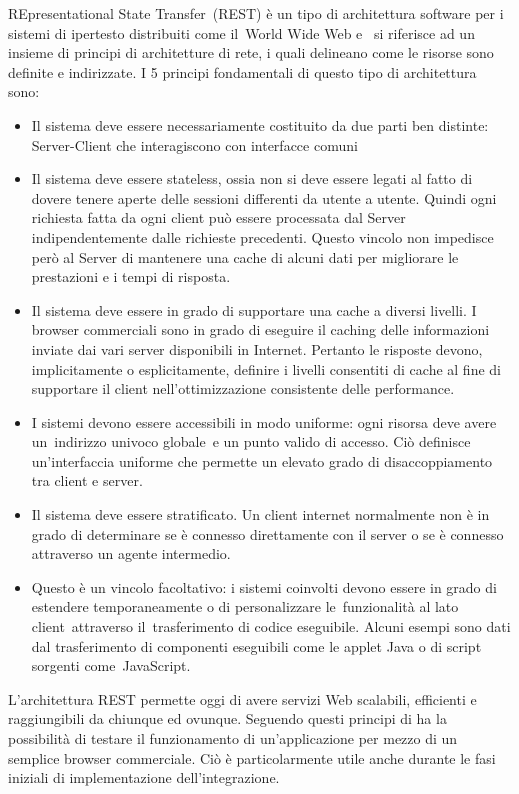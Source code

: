 REpresentational State Transfer (REST) è un tipo di architettura software per i sistemi di ipertesto distribuiti come il World Wide Web e  si riferisce ad un insieme di principi di architetture di rete, i quali delineano come le risorse sono definite e indirizzate. I 5 principi fondamentali di questo tipo di architettura sono:
\begin{itemize}
    \item Il sistema deve essere necessariamente costituito da due parti ben distinte: Server-Client che interagiscono con interfacce comuni
    \item Il sistema deve essere stateless, ossia non si deve essere legati al fatto di dovere tenere aperte delle sessioni differenti da utente a utente. Quindi ogni richiesta fatta da ogni client può essere processata dal Server indipendentemente dalle richieste precedenti. Questo vincolo non impedisce però al Server di mantenere una cache di alcuni dati per migliorare le prestazioni e i tempi di risposta.
    \item Il sistema deve essere in grado di supportare una cache a diversi livelli. I browser commerciali sono in grado di eseguire il caching delle informazioni inviate dai vari server disponibili in Internet. Pertanto le risposte devono, implicitamente o esplicitamente, definire i livelli consentiti di cache al fine di supportare il client nell’ottimizzazione consistente delle performance.
    \item I sistemi devono essere accessibili in modo uniforme: ogni risorsa deve avere un indirizzo univoco globale e un punto valido di accesso. Ciò definisce un’interfaccia uniforme che permette un elevato grado di disaccoppiamento tra client e server.
    \item Il sistema deve essere stratificato. Un client internet normalmente non è in grado di determinare se è connesso direttamente con il server o se è connesso attraverso un agente intermedio.
    \item Questo è un vincolo facoltativo: i sistemi coinvolti devono essere in grado di estendere temporaneamente o di personalizzare le funzionalità al lato client attraverso il trasferimento di codice eseguibile. Alcuni esempi sono dati dal trasferimento di componenti eseguibili come le applet Java o di script sorgenti come JavaScript.
\end{itemize}

L’architettura REST permette oggi di avere servizi Web scalabili, efficienti e raggiungibili da chiunque ed ovunque. Seguendo questi principi di ha la possibilità di testare il funzionamento di un’applicazione per mezzo di un semplice browser commerciale. Ciò è particolarmente utile anche durante le fasi iniziali di implementazione dell’integrazione.

\newpage
